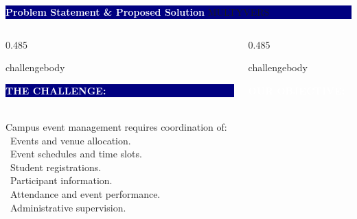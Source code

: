 \documentclass[aspectratio=169,11pt]{beamer}
\newcommand{\topbar}[2]{
\begin{beamercolorbox}[wd=\linewidth,ht=0.55cm,dp=0.12cm,
                       leftskip=0.18cm,rightskip=0.18cm,
                       rounded=true]{}
  \colorbox{navy}{\parbox[c][0.55cm][c]{\dimexpr\linewidth-0.36cm\relax}{
    \hspace{0.10cm}\textcolor{white}{\bfseries\large #1}
    \hfill\textcolor{cream}{\scriptsize #2}\hspace{0.10cm}}}
\end{beamercolorbox}
}
\begin{document}
\begin{frame}[plain]
  \topbar{Problem Statement \& Proposed Solution}{MULTYVERS}

  \vspace{0.12cm}
  \begin{columns}[T,onlytextwidth]
    \begin{column}{0.485\textwidth}
      \begin{beamercolorbox}[wd=\linewidth,rounded=true,sep=0.12cm]{challengebody}
        \colorbox{navy}{\parbox[c][0.43cm][c]{\dimexpr\linewidth-0.24cm\relax}{
          \hspace{0.10cm}\textcolor{white}{\bfseries\small THE CHALLENGE:}
        }}
        \\[3pt]

        {\scriptsize\color{muted}Campus event management requires coordination of:}\\[2pt]
        {\scriptsize
        \textcolor{cyan}{\textbullet}\ Events and venue allocation.\\[2pt]
        \textcolor{cyan}{\textbullet}\ Event schedules and time slots.\\[2pt]
        \textcolor{cyan}{\textbullet}\ Student registrations.\\[2pt]
        \textcolor{cyan}{\textbullet}\ Participant information.\\[2pt]
        \textcolor{cyan}{\textbullet}\ Attendance and event performance.\\
        \textcolor{cyan}{\textbullet}\ Administrative supervision.}
      \end{beamercolorbox}
    \end{column}

    \begin{column}{0.485\textwidth}
      \begin{beamercolorbox}[wd=\linewidth,rounded=true,sep=0.12cm]{challengebody}
        \colorbox{cyan!85!navy}{\parbox[c][0.43cm][c]{\dimexpr\linewidth-0.24cm\relax}{
          \hspace{0.10cm}\textcolor{white}{\bfseries\small OUR OBJECTIVE:}
        }}
        \vspace{0.08cm}


\end{beamercolorbox}
\end{column}
\end{columns}
\end{frame}
\end{document}

